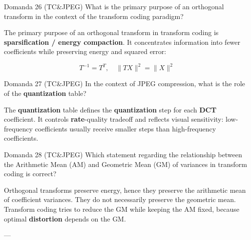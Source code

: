 \begin{questionbox}{Domanda 26}
(TC\&JPEG) What is the primary purpose of an orthogonal transform in the context of the transform coding paradigm?
\end{questionbox}


The primary purpose of an orthogonal transform in transform coding is \textbf{sparsification / energy compaction}. It concentrates information into fewer coefficients while preserving energy and squared error:


$$
T^{-1}=T^T,\quad \|TX\|^2=\|X\|^2
$$




\begin{questionbox}{Domanda 27}
(TC\&JPEG) In the context of JPEG compression, what is the role of the \textbf{quantization} table?
\end{questionbox}


The \textbf{quantization} table defines the \textbf{quantization} step for each \textbf{DCT} coefficient. It controls \textbf{rate}-quality tradeoff and reflects visual sensitivity: low-frequency coefficients usually receive smaller steps than high-frequency coefficients.



\begin{questionbox}{Domanda 28}
(TC\&JPEG) Which statement regarding the relationship between the Arithmetic Mean (AM) and Geometric Mean (GM) of variances in transform coding is correct?
\end{questionbox}


Orthogonal transforms preserve energy, hence they preserve the arithmetic mean of coefficient variances. They do not necessarily preserve the geometric mean. Transform coding tries to reduce the GM while keeping the AM fixed, because optimal \textbf{distortion} depends on the GM.

---


